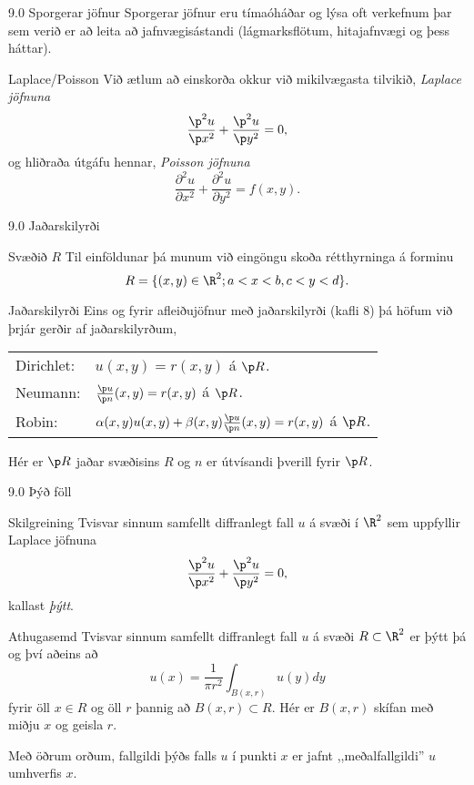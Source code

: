 \begin{frame}{9.0 Sporgerar jöfnur}
 Sporgerar jöfnur eru tímaóháðar og lýsa oft verkefnum þar sem verið er að
 leita að jafnvægisástandi \pause (lágmarksflötum, hitajafnvægi og þess háttar).
 \pause
 
 \begin{block}{Laplace/Poisson}
 Við ætlum að einskorða okkur við mikilvægasta tilvikið, \emph{Laplace jöfnuna}
 $$
  \frac{\p^2 u}{\p x^2} + \frac{\p^2 u}{\p y^2} = 0,
 $$\pause
 og hliðraða útgáfu hennar, \emph{Poisson jöfnuna}
 $$
  \frac{\partial^2 u}{\partial x^2} + \frac{\partial^2 u}{\partial y^2} = f(x,y).
 $$
 \end{block}
\end{frame}

\begin{frame}{9.0 Jaðarskilyrði}
\begin{block}{Svæðið $R$}
  Til einföldunar þá munum við eingöngu skoða rétthyrninga á forminu
  $$
    R = \{ (x,y) \in \R^2 ; a < x < b, c < y < d \}.
  $$
\end{block}
  
\begin{block}{Jaðarskilyrði}
 Eins og fyrir afleiðujöfnur með jaðarskilyrði (kafli 8) þá höfum við þrjár gerðir
 af jaðarskilyrðum,
 \begin{center}
 \begin{tabular}{ll}
  Dirichlet: & $u(x,y) = r(x,y)$ á $\p R$.\\
  Neumann:   & $\frac{\p u}{\p n}(x,y) = r(x,y)$ á $\p R$.\\
  Robin:     & $\alpha(x,y)u(x,y) + 
  \beta(x,y)\frac{\p u}{\p n}(x,y) = r(x,y)$ á  $\p R$.\\
 \end{tabular}
 \end{center}
Hér er $\p R$ jaðar svæðisins $R$ og $n$ er útvísandi þverill fyrir $\p R$.
\end{block}
\end{frame}

\begin{frame}{9.0 Þýð föll}
 \begin{block}{Skilgreining}
  Tvisvar sinnum samfellt diffranlegt fall $u$ á svæði í $\R^2$ sem uppfyllir
  Laplace jöfnuna
  $$ 
    \frac{\p^2 u}{\p x^2} + \frac{\p^2 u}{\p y^2} = 0,
  $$
  kallast \emph{þýtt}.
 \end{block}
 
 \pause
 \begin{block}{Athugasemd}
  Tvisvar sinnum samfellt diffranlegt fall $u$ á svæði $R \subset \R^2$ er 
  þýtt þá og því aðeins að 
  $$
  u(x) = \frac{1}{\pi r^2} \int_{B(x,r)} u(y) dy
  $$
  fyrir öll $x \in R$ og öll $r$ þannig að $B(x,r) \subset R$. Hér er
  $B(x,r)$ skífan með miðju $x$ og geisla $r$.
  
  \pause
  Með öðrum orðum, fallgildi þýðs falls $u$ í punkti $x$ er jafnt ,,meðalfallgildi''
  $u$ umhverfis $x$.
 \end{block}
\end{frame}

